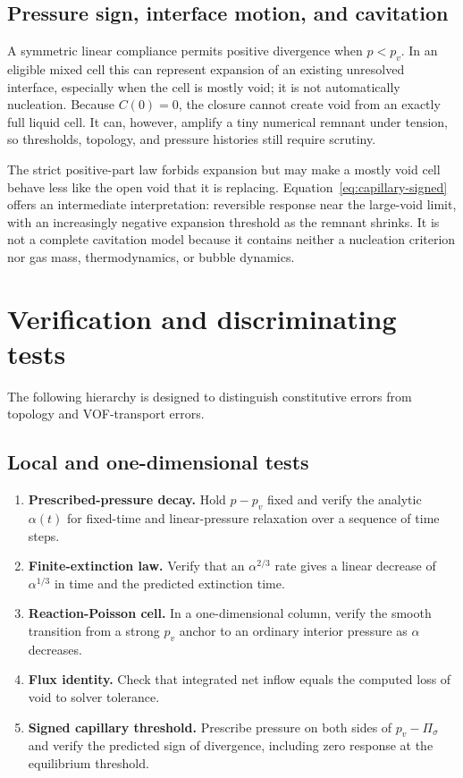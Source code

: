 \documentclass[11pt]{article}
\begin{document}
\subsection{Pressure sign, interface motion, and cavitation}

A symmetric linear compliance permits positive divergence when \(p<p_v\).  In an
eligible mixed cell this can represent expansion of an existing unresolved interface,
especially when the cell is mostly void; it is not automatically nucleation.  Because
\(C(0)=0\), the closure cannot create void from an exactly full liquid cell.  It can,
however, amplify a tiny numerical remnant under tension, so thresholds, topology, and
pressure histories still require scrutiny.

The strict positive-part law forbids expansion but may make a mostly void cell behave
less like the open void that it is replacing.  Equation~\eqref{eq:capillary-signed}
offers an intermediate interpretation: reversible response near the large-void limit,
with an increasingly negative expansion threshold as the remnant shrinks.  It is not a
complete cavitation model because it contains neither a nucleation criterion nor gas
mass, thermodynamics, or bubble dynamics.

\section{Verification and discriminating tests}

The following hierarchy is designed to distinguish constitutive errors from topology and
VOF-transport errors.

\subsection{Local and one-dimensional tests}
\begin{enumerate}
  \item \textbf{Prescribed-pressure decay.}  Hold \(p-p_v\) fixed and verify the analytic
        \(\alpha(t)\) for fixed-time and linear-pressure relaxation over a sequence of
        time steps.
  \item \textbf{Finite-extinction law.}  Verify that an \(\alpha^{2/3}\) rate gives a
        linear decrease of \(\alpha^{1/3}\) in time and the predicted extinction time.
  \item \textbf{Reaction-Poisson cell.}  In a one-dimensional column, verify the smooth
        transition from a strong \(p_v\) anchor to an ordinary interior pressure as
        \(\alpha\) decreases.
  \item \textbf{Flux identity.}  Check that integrated net inflow equals the computed
        loss of void to solver tolerance.
  \item \textbf{Signed capillary threshold.}  Prescribe pressure on both sides of
        \(p_v-\Pi_\sigma\) and verify the predicted sign of divergence, including zero
        response at the equilibrium threshold.
\end{enumerate}
\end{document}
